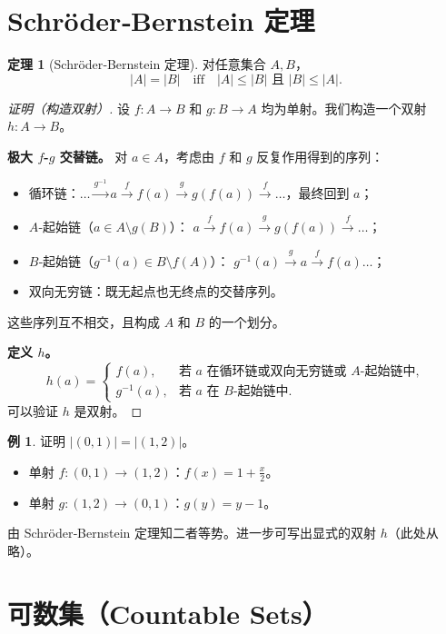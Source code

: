 \documentclass[UTF8,11pt,a4paper]{ctexbook}   %
\theoremstyle{definition}
\newtheorem{theorem}{定理}[section]
\newtheorem{example}{例}[section]
\begin{document}
\section{Schröder‑Bernstein 定理}

\begin{theorem}[Schröder‑Bernstein 定理]
对任意集合 $A,B$，
\[
|A| = |B| \quad \text{iff} \quad |A| \leq |B| \text{ 且 } |B| \leq |A|.
\]
\end{theorem}

\begin{proof}[证明（构造双射）]
设 $f:A\to B$ 和 $g:B\to A$ 均为单射。我们构造一个双射 $h:A\to B$。

\medskip
\textbf{极大 $f$-$g$ 交替链。}
对 $a\in A$，考虑由 $f$ 和 $g$ 反复作用得到的序列：
\begin{itemize}
    \item 循环链：$\dots \xrightarrow{g^{-1}} a \xrightarrow{f} f(a) \xrightarrow{g} g(f(a)) \xrightarrow{f} \dots$，最终回到 $a$；
    \item $A$‑起始链（$a\in A\setminus g(B)$）：
        $a \xrightarrow{f} f(a) \xrightarrow{g} g(f(a)) \xrightarrow{f} \dots$；
    \item $B$‑起始链（$g^{-1}(a)\in B\setminus f(A)$）：
        $g^{-1}(a) \xrightarrow{g} a \xrightarrow{f} f(a) \dots$；
    \item 双向无穷链：既无起点也无终点的交替序列。
\end{itemize}
这些序列互不相交，且构成 $A$ 和 $B$ 的一个划分。

\medskip
\textbf{定义 $h$。}
\[
h(a) =
\begin{cases}
f(a), & \text{若 } a \text{ 在循环链或双向无穷链或 } A\text{-起始链中},\\[0.4em]
g^{-1}(a), & \text{若 } a \text{ 在 } B\text{-起始链中}.
\end{cases}
\]
可以验证 $h$ 是双射。
\end{proof}

\begin{example}
证明 $|(0,1)| = |(1,2)|$。
\begin{itemize}
    \item 单射 $f:(0,1)\to(1,2)$：$f(x)=1+\frac{x}{2}$。
    \item 单射 $g:(1,2)\to(0,1)$：$g(y)=y-1$。
\end{itemize}
由 Schröder‑Bernstein 定理知二者等势。进一步可写出显式的双射 $h$（此处从略）。
\end{example}

\section{可数集（Countable Sets）}
\end{document}

